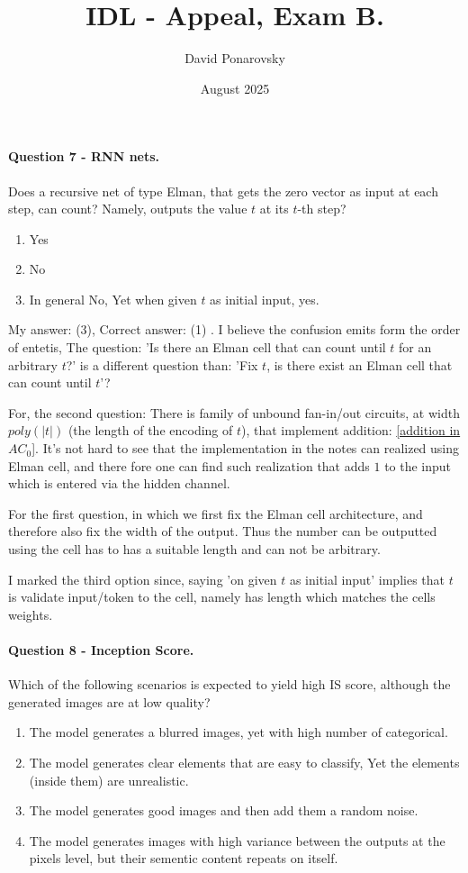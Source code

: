 \documentclass{article}
\title{IDL - Appeal, Exam B. }
\author{David Ponarovsky}
\date{August 2025}
\newcommand{\inb}[1]{ \color{blue}#1 \color{black} }
\begin{document}
\maketitle

\paragraph{ Question 7 - RNN nets.} 
Does a recursive net of type Elman, that gets the zero vector as input at each step, can count? Namely, outputs the value $t$ at its $t$-th step?
\begin{enumerate}
  \item Yes
  \item No
  \item In general No, Yet when given $t$ as initial input, yes. 
\end{enumerate}
\inb{ My answer: (3), Correct answer: (1)}. 
I believe the confusion emits form the order of entetis, The question: 'Is there an Elman cell that can count until $t$ for an arbitrary $t$?' is a different question than: 'Fix $t$, is there exist an Elman cell that can count until $t$'? 

For, the second question: There is family of unbound fan-in/out circuits, at width $poly(|t|)$ (the length of the encoding of $t$), that implement addition: \href{https://people.clarkson.edu/~alexis/PCMI/Notes/lectureB02.pdf}{[addition in $AC_{0}$]}. 
It's not hard to see that the implementation in the notes can realized using Elman cell, and there fore one can find such realization that adds $1$ to the input which is entered via the hidden channel.  

For the first question, in which we first fix the Elman cell architecture, and therefore also fix the width of the output. Thus the number can be outputted using the cell has to has a suitable length and can not be arbitrary.

I marked the third option since, saying 'on given $t$ as initial input' implies that $t$ is validate input/token to the cell, namely has length which matches the cells weights.  


\paragraph{ Question 8 - Inception Score. } Which of the following scenarios is expected to yield high IS score, although the generated images are at low quality?
\begin{enumerate}
  \item The model generates a blurred images, yet with high number of categorical.  
  \item The model generates clear elements that are easy to classify, Yet the elements (inside them) are unrealistic. 
  \item The model generates good images and then add them a random noise. 
  \item The model generates images with high variance between the outputs at the pixels level, but their sementic content repeats on itself.    
\end{enumerate}
\end{document}
